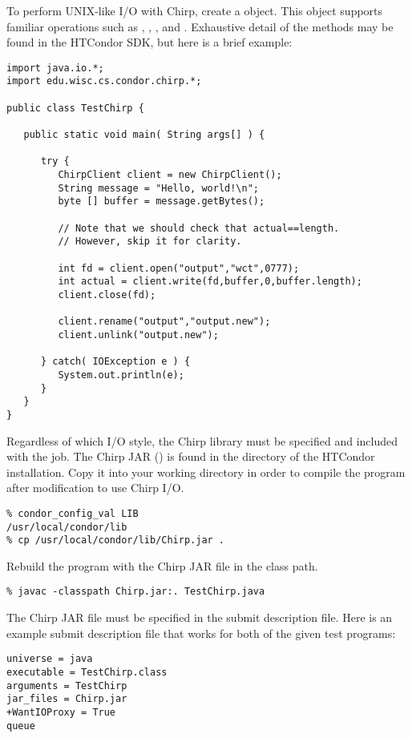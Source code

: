 To perform UNIX-like I/O with Chirp,
create a  object.
This object supports familiar operations such as , ,
, and .
Exhaustive detail of the methods may be found in the HTCondor 
SDK, but here is a brief example:

\begin{verbatim}
import java.io.*;
import edu.wisc.cs.condor.chirp.*;

public class TestChirp {

   public static void main( String args[] ) {

      try {
         ChirpClient client = new ChirpClient();
         String message = "Hello, world!\n";
         byte [] buffer = message.getBytes();

         // Note that we should check that actual==length.
         // However, skip it for clarity.

         int fd = client.open("output","wct",0777);
         int actual = client.write(fd,buffer,0,buffer.length);
         client.close(fd);

         client.rename("output","output.new");
         client.unlink("output.new");

      } catch( IOException e ) {
         System.out.println(e);
      }
   }
}
\end{verbatim}

Regardless of which I/O style, 
the Chirp library must be specified and included with the job.
The Chirp JAR ()
is found in the  directory of the HTCondor installation.
Copy it into your working directory in order to
compile the program after modification to use Chirp I/O.

\begin{verbatim}
% condor_config_val LIB
/usr/local/condor/lib
% cp /usr/local/condor/lib/Chirp.jar .
\end{verbatim}

Rebuild the program with the Chirp JAR file in the class path.

\begin{verbatim}
% javac -classpath Chirp.jar:. TestChirp.java
\end{verbatim}

The Chirp JAR file must be specified in the submit description file.
Here is an example submit description file that works for both
of the given test programs:

\begin{verbatim}
universe = java
executable = TestChirp.class
arguments = TestChirp
jar_files = Chirp.jar
+WantIOProxy = True
queue
\end{verbatim}
